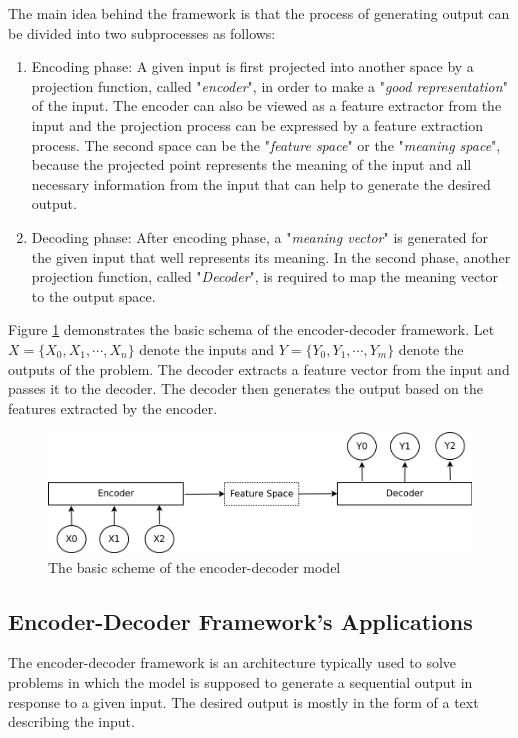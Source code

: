 \documentclass[preprint, 12pt]{elsarticle}
\begin{document}
		The main idea behind the framework is that the process of generating output can be divided into two subprocesses as follows:
		\begin{enumerate}
			\item Encoding phase: A given input is first projected into another space by a projection function, called "\textit{encoder}", in order to make a "\textit{good representation}" of the input. The encoder can also be viewed as a feature extractor from the input and the projection process can be expressed by a feature extraction process. The second space can be the "\textit{feature space}" or the "\textit{meaning space}", because the projected point represents the meaning of the input and all necessary information from the input that can help to generate the desired output.
			\item Decoding phase: After encoding phase, a "\textit{meaning vector}" is generated for the given input that well represents its meaning. In the second phase, another projection function, called "\textit{Decoder}", is required to map the meaning vector to the output space.
		\end{enumerate} 
	
		Figure \ref{fig:encdec} demonstrates the basic schema of the encoder-decoder framework. Let $X = \{X_0, X_1, \cdots, X_n\}$ denote the inputs and $Y = \{Y_0, Y_1, \cdots, Y_m\}$ denote the outputs of the problem. The decoder extracts a feature vector from the input and passes it to the decoder. The decoder then generates the output based on the features extracted by the encoder.
		\begin{figure}[H]
			\centering
			\includegraphics[scale=0.4]{Imgs/encoder_decoder.png}
			\caption{The basic scheme of the encoder-decoder model}
			\label{fig:encdec}
		\end{figure}
		
		\subsection{Encoder-Decoder Framework's Applications}
		The encoder-decoder framework is an architecture typically used to solve problems in which the model is supposed to generate a sequential output in response to a given input. The desired output is mostly in the form of a text describing the input.
		
\end{document}
